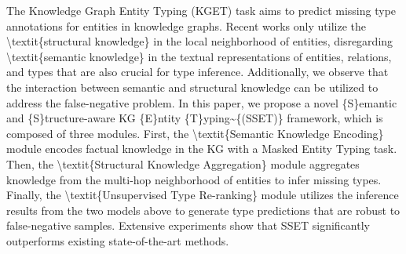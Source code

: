 The Knowledge Graph Entity Typing (KGET) task aims to predict missing type annotations for entities in knowledge graphs. Recent works only utilize the \textbackslash{}textit\{{structural knowledge\}} in the local neighborhood of entities, disregarding \textbackslash{}textit\{{semantic knowledge\}} in the textual representations of entities, relations, and types that are also crucial for type inference. Additionally, we observe that the interaction between semantic and structural knowledge can be utilized to address the false-negative problem. In this paper, we propose a novel \{{S\}}emantic and \{{S\}}tructure-aware KG \{{E\}}ntity \{{T\}}yping\textasciitilde{}\{(SSET)\} framework, which is composed of three modules. First, the \textbackslash{}textit\{Semantic Knowledge Encoding\} module encodes factual knowledge in the KG with a Masked Entity Typing task. Then, the \textbackslash{}textit\{Structural Knowledge Aggregation\} module aggregates knowledge from the multi-hop neighborhood of entities to infer missing types. Finally, the \textbackslash{}textit\{Unsupervised Type Re-ranking\} module utilizes the inference results from the two models above to generate type predictions that are robust to false-negative samples. Extensive experiments show that SSET significantly outperforms existing state-of-the-art methods.